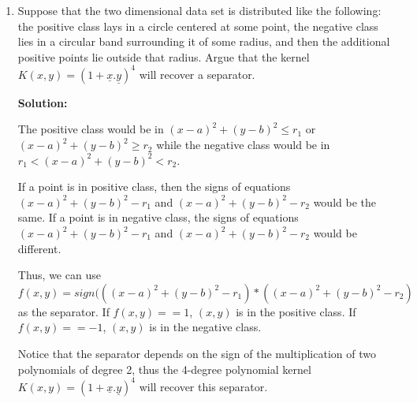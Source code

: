 \documentclass[letter, 12pt]{article}
\begin{document}
\begin{enumerate}
    	\item{Suppose that the two dimensional data set is distributed like the following: the positive class lays in a circle centered at some point, the negative class lies in a circular band surrounding it of some radius, and then the additional positive points lie outside that radius. Argue that the kernel $ K(x, y) = (1 + \underline{x}.\underline{y})^4 $ will recover a separator.}
    	\par{\textbf{Solution:}}
    	\par{The positive class would be in $ (x - a)^2 + (y - b)^2 \le r_1 $ or $ (x - a)^2 + (y - b)^2 \ge r_2 $ while the negative class would be in $ r_1 < (x - a)^2 + (y - b)^2 < r_2 $.}
    	\par{If a point is in positive class, then the signs of equations $ (x - a)^2 + (y - b)^2 - r_1 $ and $ (x - a)^2 + (y - b)^2 - r_2 $ would be the same. If a point is in negative class, the signs of equations $ (x - a)^2 + (y - b)^2 - r_1 $ and $ (x - a)^2 + (y - b)^2 - r_2 $ would be different.}
    	\par{Thus, we can use $ f(x, y) = sign(((x - a)^2 + (y - b)^2 - r_1) * ((x - a)^2 + (y - b)^2 - r_2) $ as the separator. If $ f(x, y) == 1 $, $ (x, y) $ is in the positive class. If $ f(x, y) == -1 $, $ (x, y) $ is in the negative class.}
    	\par{Notice that the separator depends on the sign of the multiplication of two polynomials of degree 2, thus the 4-degree polynomial kernel $ K(x, y) = (1 + \underline{x}.\underline{y})^4 $ will recover this separator.}
    	

\end{enumerate}
\end{document}
